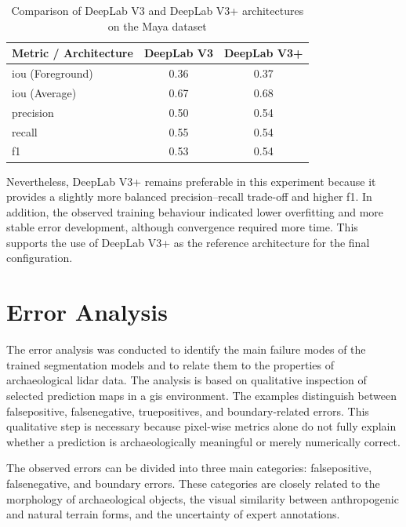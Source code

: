 \begin{table}[H]
    \centering
    \caption{Comparison of DeepLab V3 and DeepLab V3+ architectures on the Maya dataset}
    \label{tab:maya_architecture_metrics}
    \small
    \setlength{\tabcolsep}{6pt}
    \renewcommand{\arraystretch}{1.15}
    \begin{tabular}{lcc}
        \toprule
        \textbf{Metric / Architecture} & \textbf{DeepLab V3} & \textbf{DeepLab V3+} \\
        \midrule
        \gls{iou} (Foreground) & 0.36 & 0.37 \\
        \gls{iou} (Average)    & 0.67 & 0.68 \\
        precision        & 0.50 & 0.54 \\
        recall           & 0.55 & 0.54 \\
        \gls{f1}         & 0.53 & 0.54 \\
        \bottomrule
    \end{tabular}
\end{table}

Nevertheless, DeepLab V3+ remains preferable in this experiment because it provides a slightly more balanced precision--recall trade-off and higher \gls{f1}. In addition, the observed training behaviour indicated lower overfitting and more stable error development, although convergence required more time. This supports the use of DeepLab V3+ as the reference architecture for the final configuration.

\section{Error Analysis}

The error analysis was conducted to identify the main failure modes of the trained segmentation models and to relate them to the properties of archaeological \gls{lidar} data. The analysis is based on qualitative inspection of selected prediction maps in a \gls{gis} environment. The examples distinguish between \gls{falsepositive}, \gls{falsenegative}, \glspl{truepositive}, and boundary-related errors. This qualitative step is necessary because pixel-wise metrics alone do not fully explain whether a prediction is archaeologically meaningful or merely numerically correct.

The observed errors can be divided into three main categories: \gls{falsepositive}, \gls{falsenegative}, and boundary errors. These categories are closely related to the morphology of archaeological objects, the visual similarity between anthropogenic and natural terrain forms, and the uncertainty of expert annotations.

